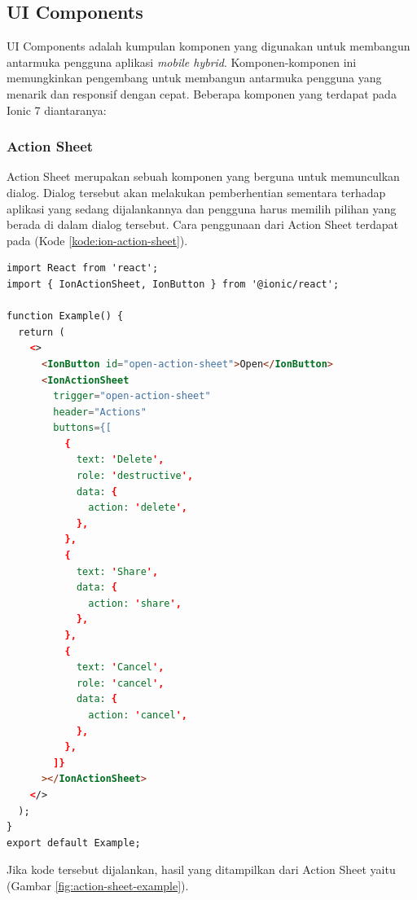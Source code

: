 \subsection{UI Components}
UI Components adalah kumpulan komponen yang digunakan untuk membangun antarmuka pengguna aplikasi \textit{mobile hybrid}. Komponen-komponen ini memungkinkan pengembang untuk membangun antarmuka pengguna yang menarik dan responsif dengan cepat. Beberapa komponen yang terdapat pada Ionic 7 diantaranya:

\subsubsection{Action Sheet}
Action Sheet merupakan sebuah komponen yang berguna untuk memunculkan dialog. Dialog tersebut akan melakukan pemberhentian sementara terhadap aplikasi yang sedang dijalankannya dan pengguna harus memilih pilihan yang berada di dalam dialog tersebut. Cara penggunaan dari Action Sheet terdapat pada (Kode \ref{kode:ion-action-sheet}).

\begin{lstlisting}[language=HTML, caption=Contoh Potongan Kode Action Sheet, label=kode:ion-action-sheet]
import React from 'react';
import { IonActionSheet, IonButton } from '@ionic/react';

function Example() {
  return (
    <>
      <IonButton id="open-action-sheet">Open</IonButton>
      <IonActionSheet
        trigger="open-action-sheet"
        header="Actions"
        buttons={[
          {
            text: 'Delete',
            role: 'destructive',
            data: {
              action: 'delete',
            },
          },
          {
            text: 'Share',
            data: {
              action: 'share',
            },
          },
          {
            text: 'Cancel',
            role: 'cancel',
            data: {
              action: 'cancel',
            },
          },
        ]}
      ></IonActionSheet>
    </>
  );
}
export default Example;
\end{lstlisting}

Jika kode tersebut dijalankan, hasil yang ditampilkan dari Action Sheet yaitu (Gambar \ref{fig:action-sheet-example}).

